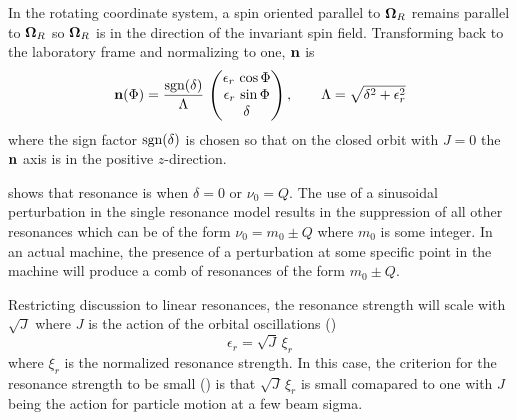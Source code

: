 In the rotating coordinate system, a spin oriented parallel to ${\bf \Omega}_R$ remains parallel to
${\bf \Omega}_R$ so ${\bf \Omega}_R$ is in the direction of the invariant spin field. Transforming back
to the laboratory frame and normalizing to one, ${\bf n}$ is
\begin{equation}
  {\bf n} (\Phi) = \frac{{\text{sgn}}(\delta)}{\Lambda} \, 
  \begin{pmatrix}
    \epsilon_r \, \cos \Phi \\
    \epsilon_r \, \sin \Phi \\
    \delta
  \end{pmatrix},
  \qquad
  \Lambda = \sqrt{\delta^2 + \epsilon_r^2}
  \label{nsdl}
\end{equation}
where the sign factor ${\text{sgn}}(\delta)$ is chosen so that on the closed orbit with $J = 0$ the ${\bf n}$
axis is in the positive $z$-direction.

 shows that resonance is when $\delta = 0$ or $\nu_0 = Q$.  The use of a sinusoidal
perturbation in the single resonance model results in the suppression of all other resonances
which can be of the form $\nu_0 = m_0 \pm Q$ where $m_0$ is some integer. In an actual machine, the
presence of a perturbation at some specific point in the machine will produce a comb of resonances
of the form $m_0 \pm Q$.

Restricting discussion to linear resonances, the resonance strength will scale with $\sqrt{J}$ where $J$
is the action of the orbital oscillations ()
\begin{equation}
  \epsilon_r = \sqrt{J} \, \xi_r
  \label{ejx}
\end{equation}
where $\xi_r$ is the normalized resonance strength. In this case, the criterion for the resonance
strength to be small () is that $\sqrt{J} \, \xi_r$ is small comapared to one with $J$ being
the action for particle motion at a few beam sigma.

